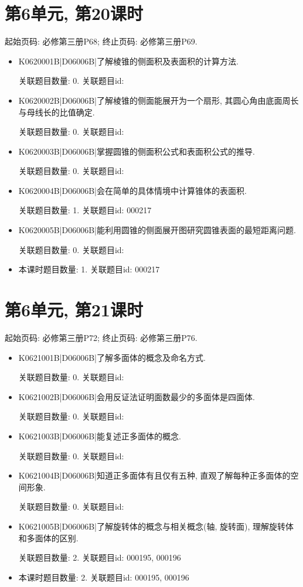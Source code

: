 \section*{第6单元, 第20课时}
起始页码: 必修第三册P68; 终止页码: 必修第三册P69.
\begin{itemize}
\item K0620001B|D06006B|了解棱锥的侧面积及表面积的计算方法.

关联题目数量: 0. 关联题目id: 

\item K0620002B|D06006B|了解棱锥的侧面能展开为一个扇形, 其圆心角由底面周长与母线长的比值确定.

关联题目数量: 0. 关联题目id: 

\item K0620003B|D06006B|掌握圆锥的侧面积公式和表面积公式的推导.

关联题目数量: 0. 关联题目id: 

\item K0620004B|D06006B|会在简单的具体情境中计算锥体的表面积.

关联题目数量: 1. 关联题目id: 000217

\item K0620005B|D06006B|能利用圆锥的侧面展开图研究圆锥表面的最短距离问题.

关联题目数量: 0. 关联题目id: 

\item 本课时题目数量: 1. 关联题目id: 000217

\end{itemize}

\section*{第6单元, 第21课时}
起始页码: 必修第三册P72; 终止页码: 必修第三册P76.
\begin{itemize}
\item K0621001B|D06006B|了解多面体的概念及命名方式.

关联题目数量: 0. 关联题目id: 

\item K0621002B|D06006B|会用反证法证明面数最少的多面体是四面体.

关联题目数量: 0. 关联题目id: 

\item K0621003B|D06006B|能复述正多面体的概念.

关联题目数量: 0. 关联题目id: 

\item K0621004B|D06006B|知道正多面体有且仅有五种, 直观了解每种正多面体的空间形象.

关联题目数量: 0. 关联题目id: 

\item K0621005B|D06006B|了解旋转体的概念与相关概念(轴, 旋转面), 理解旋转体和多面体的区别.

关联题目数量: 2. 关联题目id: 000195, 000196

\item 本课时题目数量: 2. 关联题目id: 000195, 000196

\end{itemize}

